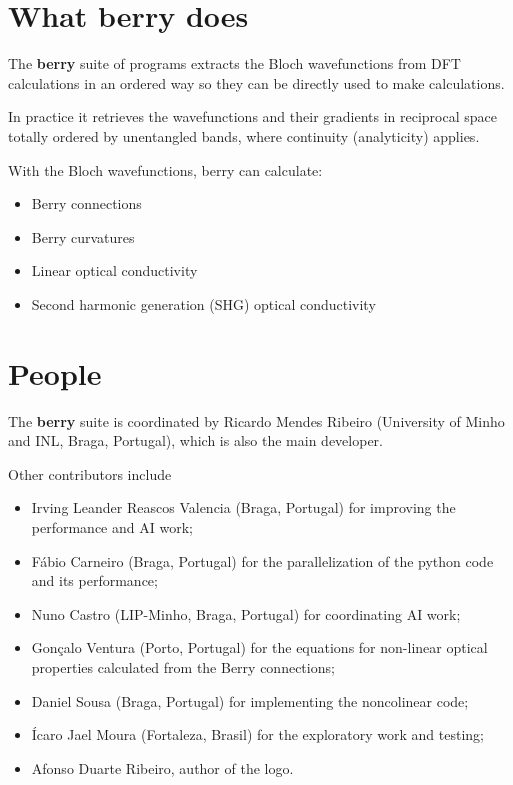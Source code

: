 \documentclass[a4paper,12pt]{report}
\begin{document}
\section{What \textbf{berry} does}

The \textbf{berry} suite of programs extracts the Bloch wavefunctions from DFT calculations in an ordered way
so they can be directly used to make calculations.

In practice it retrieves the wavefunctions and their gradients in reciprocal space totally ordered
by unentangled bands, where continuity (analyticity) applies.

With the Bloch wavefunctions, berry can calculate:
\begin{itemize}
  \item Berry connections
  \item Berry curvatures
  \item Linear optical conductivity
  \item Second harmonic generation (SHG) optical conductivity
\end{itemize}









\section{People}

The \textbf{berry} suite is coordinated by Ricardo Mendes Ribeiro (University of Minho and INL, Braga, Portugal),
which is also the main developer.\medskip

Other contributors include
\begin{itemize}
 \item Irving Leander Reascos Valencia (Braga, Portugal) for improving the performance
 and AI work;
 \item Fábio Carneiro (Braga, Portugal) for the parallelization of the python code
 and its performance;
 \item Nuno Castro (LIP-Minho, Braga, Portugal) for coordinating AI work;
 \item Gonçalo Ventura (Porto, Portugal) for the equations for non-linear optical properties
 calculated from the Berry connections;
 \item Daniel Sousa (Braga, Portugal) for implementing the noncolinear code;
 \item Ícaro Jael Moura (Fortaleza, Brasil) for the exploratory work and testing;
 \item Afonso Duarte Ribeiro, author of the logo.
\end{itemize}
\end{document}
